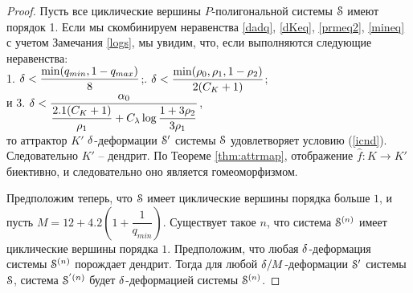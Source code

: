 \begin{proof}
Пусть все циклические вершины $P$-полигональной системы ${\EuScript S}$ имеют порядок 1. 
Если мы   скомбинируем неравенства \ref{dadq}, \ref{dKeq}, \ref{prmeq2}, \ref{mineq} с учетом Замечания \ref{logs}, мы увидим, что, если выполняются следующие неравенства:\\
1. $\delta<\dfrac{\mathop{\rm min} \nolimits(q_{min},1-q_{max})}{8}$;\qquad{}. $\delta<\dfrac{\mathop{\rm min} \nolimits(\rho_0,\rho_1,1-\rho_2)}{2(C_K+1)}$;\\
 и  
3. $\delta<\dfrac{\alpha_0}{\dfrac{2.1(C_K+1)}{\rho_1}+C_\lambda\log\dfrac{1+3\rho_2}{3\rho_1}}$,\\ 
то аттрактор $K'$ $\delta$-деформации ${\EuScript S}'$ системы ${\EuScript S}$ удовлетворяет условию (\ref{icnd}). 
Следовательно $K'$ -- дендрит. 
По Теореме \ref{thm:attrmap}, отображение $\hat f:K\to K'$ биективно, и следовательно оно является гомеоморфизмом.
 
Предположим теперь, что ${\EuScript S}$ имеет циклические вершины порядка больше $1$, и пусть $M=12+4.2\left(1+\dfrac{1}{q_{min}}\right)$. 
Существует такое $n$, что система ${\EuScript S}^{(n)}$ имеет циклические вершины порядка $1$. 
Предположим, что любая $\delta$-деформация системы ${\EuScript S}^{(n)}$ порождает дендрит. 
Тогда для любой $\delta/M$-деформации ${\EuScript S}'$ системы ${\EuScript S}$, система ${\EuScript S}^{'(n)}$ будет $\delta$-деформацией системы ${\EuScript S}^{(n)}$.
\end{proof}